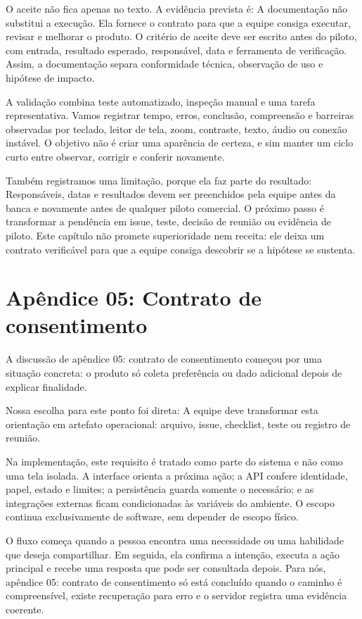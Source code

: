 \documentclass[12pt,oneside,a4paper,article]{abntex2}
\begin{document}
O aceite não fica apenas no texto. A evidência prevista é: A documentação não substitui a execução. Ela fornece o contrato para que a equipe consiga executar, revisar e melhorar o produto. O critério de aceite deve ser escrito antes do piloto, com entrada, resultado esperado, responsável, data e ferramenta de verificação. Assim, a documentação separa conformidade técnica, observação de uso e hipótese de impacto.

A validação combina teste automatizado, inspeção manual e uma tarefa representativa. Vamos registrar tempo, erros, conclusão, compreensão e barreiras observadas por teclado, leitor de tela, zoom, contraste, texto, áudio ou conexão instável. O objetivo não é criar uma aparência de certeza, e sim manter um ciclo curto entre observar, corrigir e conferir novamente.

Também registramos uma limitação, porque ela faz parte do resultado: Responsáveis, datas e resultados devem ser preenchidos pela equipe antes da banca e novamente antes de qualquer piloto comercial. O próximo passo é transformar a pendência em issue, teste, decisão de reunião ou evidência de piloto. Este capítulo não promete superioridade nem receita: ele deixa um contrato verificável para que a equipe consiga descobrir se a hipótese se sustenta.

\section{Apêndice 05: Contrato de consentimento}
A discussão de apêndice 05: contrato de consentimento começou por uma situação concreta: o produto só coleta preferência ou dado adicional depois de explicar finalidade.

Nossa escolha para este ponto foi direta: A equipe deve transformar esta orientação em artefato operacional: arquivo, issue, checklist, teste ou registro de reunião.

Na implementação, este requisito é tratado como parte do sistema e não como uma tela isolada. A interface orienta a próxima ação; a API confere identidade, papel, estado e limites; a persistência guarda somente o necessário; e as integrações externas ficam condicionadas às variáveis do ambiente. O escopo continua exclusivamente de software, sem depender de escopo físico.

O fluxo começa quando a pessoa encontra uma necessidade ou uma habilidade que deseja compartilhar. Em seguida, ela confirma a intenção, executa a ação principal e recebe uma resposta que pode ser consultada depois. Para nós, apêndice 05: contrato de consentimento só está concluído quando o caminho é compreensível, existe recuperação para erro e o servidor registra uma evidência coerente.
\end{document}
